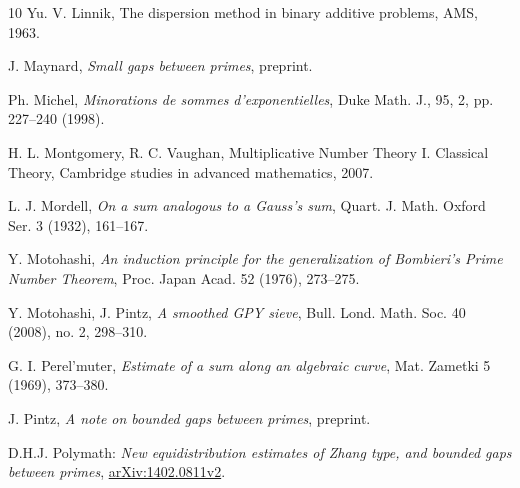 \documentclass[12pt,a4paper,reqno]{amsart}
\numberwithin{equation}{section}
\theoremstyle{plain}
\theoremstyle{definition}
\begin{document}
\begin{thebibliography}{10}
Yu. V. Linnik, The dispersion method in binary additive problems, AMS, 1963.

  

J. Maynard, \emph{Small gaps between primes}, preprint.

 Ph. Michel, \emph{Minorations de sommes
    d'exponentielles}, {Duke Math. J.}, {95}, {2}, {pp. 227--240}
  ({1998}).
 


 H. L. Montgomery, R. C. Vaughan, Multiplicative
  Number Theory I. Classical Theory, Cambridge studies in advanced
  mathematics, 2007.

 L. J. Mordell, \emph{On a sum analogous to a Gauss's
    sum}, Quart. J. Math. Oxford Ser. 3 (1932), 161--167.

 Y. Motohashi, \emph{An induction principle for the
    generalization of Bombieri's Prime Number Theorem}, Proc. Japan
  Acad. 52 (1976), 273--275.

 Y. Motohashi, J. Pintz, \emph{A smoothed GPY sieve},
  Bull. Lond. Math. Soc. 40 (2008), no. 2, 298--310.

 G. I. Perel'muter, \emph{Estimate of a sum along
    an algebraic curve}, Mat. Zametki 5 (1969), 373--380.


 J. Pintz, \emph{A note on bounded gaps between
    primes}, preprint.

 D.H.J. Polymath: \emph{New equidistribution estimates
    of Zhang type, and bounded gaps between primes},
  \url{arXiv:1402.0811v2}.


\end{thebibliography}
\end{document}
